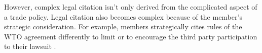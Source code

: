 However, complex legal citation isn't only derived from the complicated aspect of a trade policy.
Legal citation also becomes complex because of the member's strategic consideration. For example,
members strategically cites rules of the WTO agreement differently to limit or to encourage 
the third party participation to their lawsuit \cite{who_gets}.
